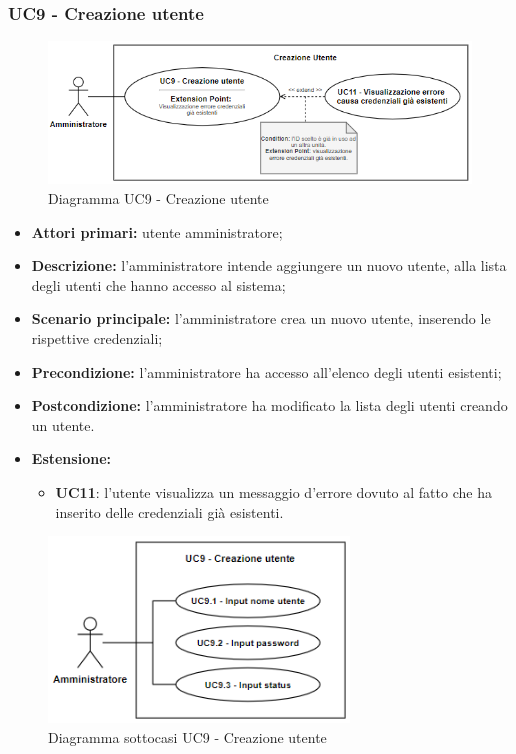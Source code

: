 \subsubsection{UC9 - Creazione utente}
	\begin{figure}[h!]
		\centering
		\includegraphics[width=14cm]{images/uc9.png}
		\caption{Diagramma UC9 - Creazione utente}
	\end{figure}
	\begin{itemize}
		\item \textbf{Attori primari:} utente amministratore;
		\item \textbf{Descrizione:} l'amministratore intende aggiungere un nuovo utente, alla lista degli utenti che hanno accesso al sistema;
		\item \textbf{Scenario principale:} l'amministratore crea un nuovo utente, inserendo le rispettive credenziali;
		\item \textbf{Precondizione:} l'amministratore ha accesso all'elenco degli utenti esistenti;
		\item \textbf{Postcondizione:} l'amministratore ha modificato la lista degli utenti creando un utente.
		\item \textbf{Estensione:}
		\begin{itemize}
			\item \textbf{UC11}: l'utente visualizza un messaggio d'errore dovuto al fatto che ha inserito delle credenziali già esistenti.
		\end{itemize}
	\end{itemize}

	\begin{figure}[h!]
		\centering
		\includegraphics[width=8cm]{images/sottocasi_uc9.png}
		\caption{Diagramma sottocasi UC9 - Creazione utente}
	\end{figure}

